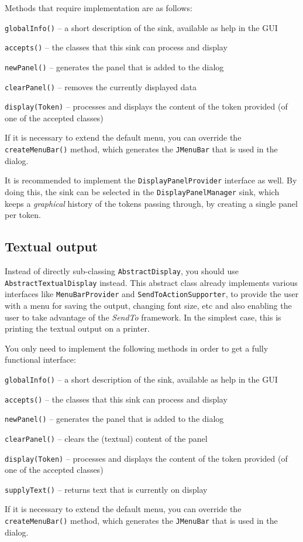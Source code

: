 Methods that require implementation are as follows:
\begin{tight_itemize}
	\item \texttt{globalInfo()} -- a short description of the sink, available 
	as help in the GUI
	\item \texttt{accepts()} -- the classes that this sink can process and 
	display
	\item \texttt{newPanel()} -- generates the panel that is added to the 
	dialog
	\item \texttt{clearPanel()} -- removes the currently displayed data
	\item \texttt{display(Token)} -- processes and displays the content of
	the token provided (of one of the accepted classes)
\end{tight_itemize}
If it is necessary to extend the default menu, you can override the 
\texttt{createMenuBar()} method, which generates the \texttt{JMenuBar} that
is used in the dialog.

It is recommended to implement the \texttt{DisplayPanelProvider} interface as
well. By doing this, the sink can be selected in the \texttt{DisplayPanelManager}
sink, which keeps a \textit{graphical} history of the tokens passing through,
by creating a single panel per token.

\subsection{Textual output}
Instead of directly sub-classing \texttt{AbstractDisplay}, you should use
\texttt{AbstractTextualDisplay} instead. This abstract class already implements
various interfaces like \texttt{MenuBarProvider} and
\texttt{SendToActionSupporter}, to provide the user with a menu for saving the 
output, changing font size, etc and also enabling the user to take advantage 
of the \textit{SendTo} framework. In the simplest case, this is printing the
textual output on a printer.

You only need to implement the following methods in order to get a fully 
functional interface:
\begin{tight_itemize}
	\item \texttt{globalInfo()} -- a short description of the sink, available 
	as help in the GUI
	\item \texttt{accepts()} -- the classes that this sink can process and 
	display
	\item \texttt{newPanel()} -- generates the panel that is added to the 
	dialog
	\item \texttt{clearPanel()} -- clears the (textual) content of the panel
	\item \texttt{display(Token)} -- processes and displays the content of
	the token provided (of one of the accepted classes)
	\item \texttt{supplyText()} -- returns text that is currently on display
\end{tight_itemize}
If it is necessary to extend the default menu, you can override the 
\texttt{createMenuBar()} method, which generates the \texttt{JMenuBar} that
is used in the dialog.

